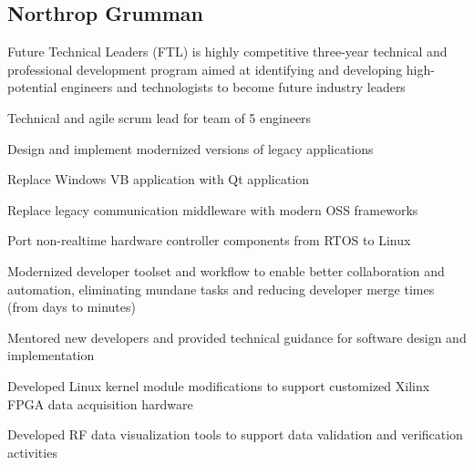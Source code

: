 \documentclass[letterpaper]{deedy-resume}
\newcommand{\experiencespace}{\vspace{2ex}}
\begin{document}
\begin{minipage}[t]{0.70\textwidth} %

    \subsection{Northrop Grumman}
    \begin{compactitem}
    \item Future Technical Leaders (FTL) is highly competitive three-year technical and professional
        development program aimed at identifying and developing high-potential engineers and technologists to
        become future industry leaders 
    \end{compactitem}
    \experiencespace

    \begin{compactitem}
        \item Technical and agile scrum lead for team of 5 engineers
        \item Design and implement modernized versions of legacy applications
        \begin{compactitem}
            \item Replace Windows VB application with Qt application
            \item Replace legacy communication middleware with modern OSS frameworks
            \item Port non-realtime hardware controller components from RTOS to Linux
        \end{compactitem}
    \end{compactitem}
    \experiencespace

    \begin{compactitem}
        \item Modernized developer toolset and workflow to enable better collaboration and automation,
            eliminating mundane tasks and reducing developer merge times (from days to minutes)
        \item Mentored new developers and provided technical guidance for software design and implementation
        \item Developed Linux kernel module modifications to support customized Xilinx FPGA data acquisition
            hardware
        \item Developed RF data visualization tools to support data validation and verification activities
    \end{compactitem}
    \experiencespace


\end{minipage}
\end{document}

